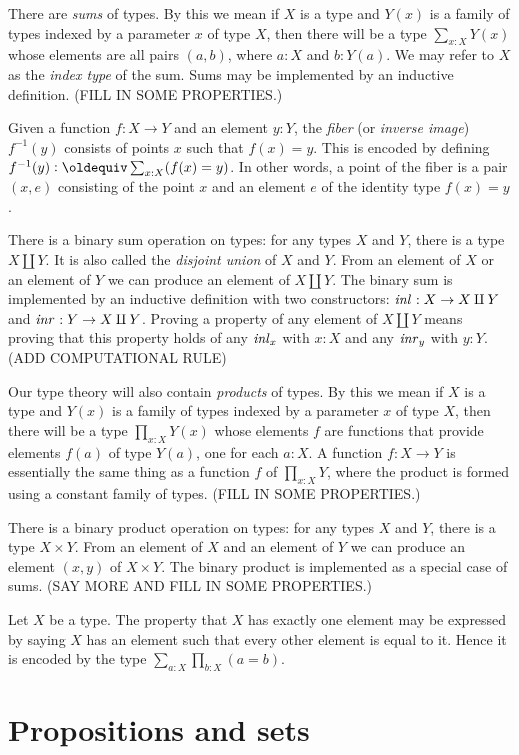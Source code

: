 There are {\em sums} of types.  By this we mean if $X$ is a type and $Y(x)$ is a family of types indexed by a parameter $x$ of type $X$, then
there will be a type $\sum _{x:X} Y(x)$ whose elements are all pairs $(a,b)$, where $a:X$ and $b:Y(a)$.  We may refer to $X$ as the {\em index
  type} of the sum.  Sums may be implemented by an inductive definition.   (FILL IN SOME PROPERTIES.)

Given a function $f : X \to Y$ and an element $y:Y$, the {\em fiber} (or {\em inverse image}) $f^{-1}(y)$ consists of points $x$ such that $f(x)
= y$.  This is encoded by defining $f^{-1}(y) \defeq \sum_{x:X} (f(x) = y)$.  In other words, a point of the fiber is a pair $(x,e)$ consisting
of the point $x$ and an element $e$ of the identity type $f(x) = y$.

There is a binary sum operation on types: for any types $X$ and $Y$, there is a type $X \amalg Y$.  It is also called the {\em disjoint union}
of $X$ and $Y$.  From an element of $X$ or an element of $Y$ we can produce an element of $X \amalg Y$.  The binary sum is implemented by an
inductive definition with two constructors: $\mathop{{\it inl}_{}} : X \to X \amalg Y$ and
$\mathop{{\it inr}_{}} : Y \to X \amalg Y$. Proving a property of any element of $X \amalg Y$
means proving that this property holds of any $\mathop{{\it inl}_{x}}$ with $x:X$ and any
$\mathop{{\it inr}_{y}}$ with $y:Y$. (ADD COMPUTATIONAL RULE)

Our type theory will also contain {\em products} of types.  By this we mean if $X$ is a type and $Y(x)$ is a family of types indexed by a
parameter $x$ of type $X$, then there will be a type $\prod _{x:X} Y(x)$ whose elements $f$ are functions that provide elements $f(a)$ of type
$Y(a)$, one for each $a:X$.  A function $f : X \to Y$ is essentially the same thing as a function $f$ of $\prod_{x:X} Y$, where the product is
formed using a constant family of types.  (FILL IN SOME PROPERTIES.)

There is a binary product operation on types: for any types $X$ and $Y$, there is a type $X \times Y$.  From an element of $X$ and an element of
$Y$ we can produce an element $(x,y)$ of $X \times Y$.  The binary product is implemented as a special case of sums.  (SAY MORE AND FILL IN SOME
PROPERTIES.)

Let $X$ be a type.  The property that $X$ has exactly one element may be expressed by saying $X$ has an element such that every other element is
equal to it.  Hence it is encoded by the type $\sum_{a:X} \prod_{b:X} (a=b)$.

\section{Propositions and sets}

